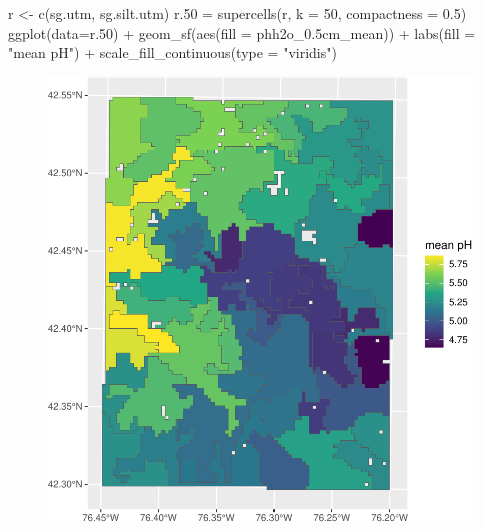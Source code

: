 \documentclass[
  letterpaper,
  DIV=11,
  numbers=noendperiod]{scrartcl}
\newenvironment{Shaded}{\begin{snugshade}}{\end{snugshade}}
\newcommand{\AttributeTok}[1]{\textcolor[rgb]{0.40,0.45,0.13}{#1}}
\newcommand{\DecValTok}[1]{\textcolor[rgb]{0.68,0.00,0.00}{#1}}
\newcommand{\FloatTok}[1]{\textcolor[rgb]{0.68,0.00,0.00}{#1}}
\newcommand{\FunctionTok}[1]{\textcolor[rgb]{0.28,0.35,0.67}{#1}}
\newcommand{\NormalTok}[1]{\textcolor[rgb]{0.00,0.23,0.31}{#1}}
\newcommand{\OtherTok}[1]{\textcolor[rgb]{0.00,0.23,0.31}{#1}}
\newcommand{\SpecialCharTok}[1]{\textcolor[rgb]{0.37,0.37,0.37}{#1}}
\newcommand{\StringTok}[1]{\textcolor[rgb]{0.13,0.47,0.30}{#1}}
\begin{document}
\begin{Shaded}
\begin{Highlighting}[]
\NormalTok{r }\OtherTok{\textless{}{-}} \FunctionTok{c}\NormalTok{(sg.utm, sg.silt.utm)}
\NormalTok{r}\FloatTok{.50} \OtherTok{=} \FunctionTok{supercells}\NormalTok{(r, }\AttributeTok{k =} \DecValTok{50}\NormalTok{, }\AttributeTok{compactness =} \FloatTok{0.5}\NormalTok{)}
\FunctionTok{ggplot}\NormalTok{(}\AttributeTok{data=}\NormalTok{r}\FloatTok{.50}\NormalTok{) }\SpecialCharTok{+}
  \FunctionTok{geom\_sf}\NormalTok{(}\FunctionTok{aes}\NormalTok{(}\AttributeTok{fill =}\NormalTok{ phh2o\_0}\FloatTok{.5}\NormalTok{cm\_mean)) }\SpecialCharTok{+}
  \FunctionTok{labs}\NormalTok{(}\AttributeTok{fill =} \StringTok{"mean pH"}\NormalTok{) }\SpecialCharTok{+}
  \FunctionTok{scale\_fill\_continuous}\NormalTok{(}\AttributeTok{type =} \StringTok{"viridis"}\NormalTok{)}
\end{Highlighting}
\end{Shaded}

\begin{figure}[H]

{\centering \includegraphics{PatternAnalysisWorkshopTutorial_files/figure-pdf/supercells-multiple-1.pdf}

}

\end{figure}
\end{document}
